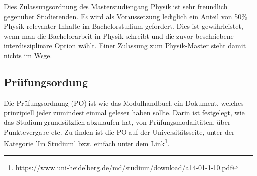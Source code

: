 Dies Zulassungsordnung des Masterstudiengang Physik ist sehr freundlich gegenüber Studierenden. Es wird als Voraussetzung lediglich ein Anteil von 50\% Physik-relevanter Inhalte im Bachelorstudium gefordert. Dies ist gewährleistet, wenn man die Bachelorarbeit in Physik schreibt und die zuvor beschriebene interdisziplinäre Option wählt. Einer Zulassung zum Physik-Master steht damit nichts im Wege.

\subsection{Prüfungsordung}

Die Prüfungsordnung (PO) ist wie das Modulhandbuch ein Dokument, welches prinzipiell jeder zumindest einmal gelesen haben sollte. Darin ist festgelegt, wie das Studium grundsätzlich abzulaufen hat, von Prüfungsmodalitäten, über Punktevergabe etc. Zu finden ist die PO auf der Universitätsseite, unter der Kategorie 'Im Studium' bzw. einfach unter dem Link\footnote{\url{https://www.uni-heidelberg.de/md/studium/download/a14-01-1-10.pdf}}. 

\begin{figure}[h] %
\end{figure}
